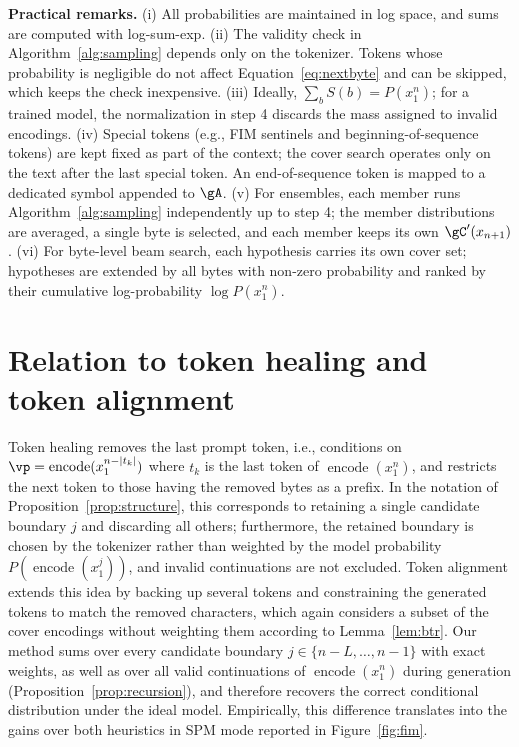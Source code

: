 \documentclass{article} %
\newcommand{\enc}{\operatorname{encode}}
\begin{document}
\textbf{Practical remarks.}
(i) All probabilities are maintained in log space, and sums are computed with log-sum-exp.
(ii) The validity check in Algorithm~\ref{alg:sampling} depends only on the tokenizer. Tokens whose probability is negligible do not affect Equation~\ref{eq:nextbyte} and can be skipped, which keeps the check inexpensive.
(iii) Ideally, $\sum_bS(b)=P(x_1^n)$; for a trained model, the normalization in step 4 discards the mass assigned to invalid encodings.
(iv) Special tokens (e.g., FIM sentinels and beginning-of-sequence tokens) are kept fixed as part of the context; the cover search operates only on the text after the last special token. An end-of-sequence token is mapped to a dedicated symbol appended to $\gA$.
(v) For ensembles, each member runs Algorithm~\ref{alg:sampling} independently up to step 4; the member distributions are averaged, a single byte is selected, and each member keeps its own $\gC'(x_{n+1})$.
(vi) For byte-level beam search, each hypothesis carries its own cover set; hypotheses are extended by all bytes with non-zero probability and ranked by their cumulative log-probability $\log P(x_1^n)$.

\section{Relation to token healing and token alignment}
\label{app:heuristics}
Token healing removes the last prompt token, i.e., conditions on $\vp=\enc(x_1^{n-|t_k|})$ where $t_k$ is the last token of $\enc(x_1^n)$, and restricts the next token to those having the removed bytes as a prefix. In the notation of Proposition~\ref{prop:structure}, this corresponds to retaining a single candidate boundary $j$ and discarding all others; furthermore, the retained boundary is chosen by the tokenizer rather than weighted by the model probability $P(\enc(x_1^j))$, and invalid continuations are not excluded. Token alignment extends this idea by backing up several tokens and constraining the generated tokens to match the removed characters, which again considers a subset of the cover encodings without weighting them according to Lemma~\ref{lem:btr}. Our method sums over every candidate boundary $j\in\{n-L,\dots,n-1\}$ with exact weights, as well as over all valid continuations of $\enc(x_1^n)$ during generation (Proposition~\ref{prop:recursion}), and therefore recovers the correct conditional distribution under the ideal model. Empirically, this difference translates into the gains over both heuristics in SPM mode reported in Figure~\ref{fig:fim}.
\end{document}
